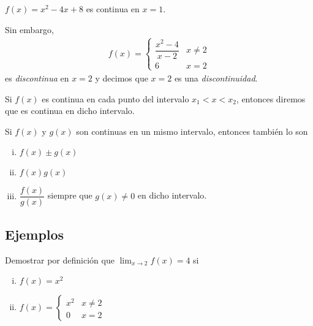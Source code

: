   \begin{problema}
   $f(x)=x^{2}-4x+8$ es continua en $x=1$.
  \end{problema}


  \begin{problema}
   Sin embargo, 
   \begin{align*}
   f(x)=
    \begin{cases}
\dfrac{x^2-4}{x-2}& x\neq 2\\
6 & x= 2
\end{cases}
    \end{align*}
    es \emph{discontinua} en $x=2$  y decimos que $x=2$ es una \emph{discontinuidad}.
  \end{problema}


{}
  Si $f(x)$ es continua en cada punto del intervalo $x_{1}<x<x_{2}$, entonces diremos que es continua en dicho intervalo.

{}
  \begin{proposicion}
   Si $f(x)$ y $g(x)$ son continuas en un mismo intervalo, entonces también lo son
   \begin{enumerate}[(i)]
     \item $f(x)\pm g(x)$ 
     
     \item $f(x)g(x)$
     
     \item $\dfrac{f(x)}{g(x)}$ siempre que $g(x)\neq 0$ en dicho intervalo.
\end{enumerate}
  \end{proposicion}


\subsection{Ejemplos}
{}
  \begin{problema}
   Demostrar por definición que $\lim_{x\to 2}f(x)=4$ si
   \begin{enumerate}[(i)]
     \item $f(x)=x^{2}$ 
     
     \item $f(x)= \begin{cases}
x^{2} & x\neq 2 \\
0 & x =2
\end{cases}$
\end{enumerate}
  \end{problema}


